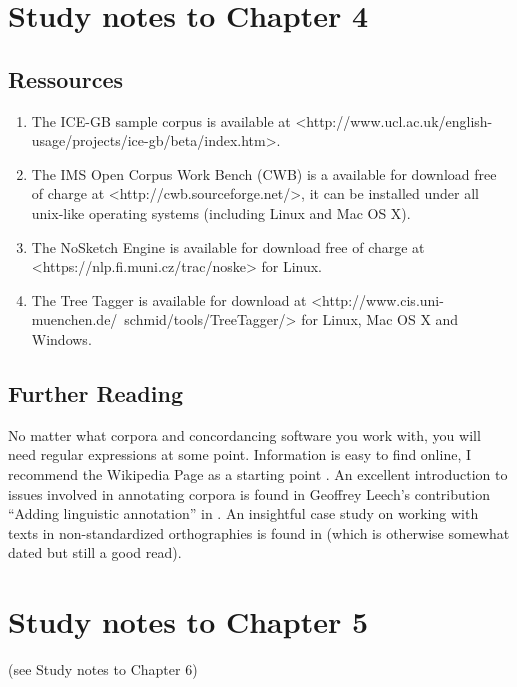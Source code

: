 \section{Study notes to Chapter 4}
\label{sec:studynotes04}


\subsection{Ressources}
\label{sec:ressources04}

\begin{enumerate}
  \item The ICE-GB sample corpus is available at <http://www.ucl.ac.uk/english-usage/projects/ice-gb/beta/index.htm>.
  \item The IMS Open Corpus Work Bench (CWB) is a available for download free of charge at <http://cwb.sourceforge.net/>, it can be installed under all unix-like operating systems (including Linux and Mac OS X).
  \item The NoSketch Engine is available for download free of charge at <https://nlp.fi.muni.cz/trac/noske> for Linux.
  \item The Tree Tagger is available for download at <http://www.cis.uni-muenchen.de/~schmid/tools/TreeTagger/> for Linux, Mac OS X and Windows.
\end{enumerate}


\subsection{Further Reading}
\label{sec:furtherreading04}

No matter what corpora and concordancing software you work with, you will need regular expressions at some point. Information is easy to find online, I recommend the Wikipedia Page as a starting point \citep{wikipedia_contributors_regular_2018}. An excellent introduction to issues involved in annotating corpora is found in Geoffrey Leech's contribution ``Adding linguistic annotation'' in \citet{wynne_developing_2005}. An insightful case study on working with texts in non-standardized orthographies is found in \citet{barnbrook_language_1996} (which is otherwise somewhat dated but still a good read).


\section{Study notes to Chapter 5}
\label{sec:studynotes05}

(see Study notes to Chapter 6)


